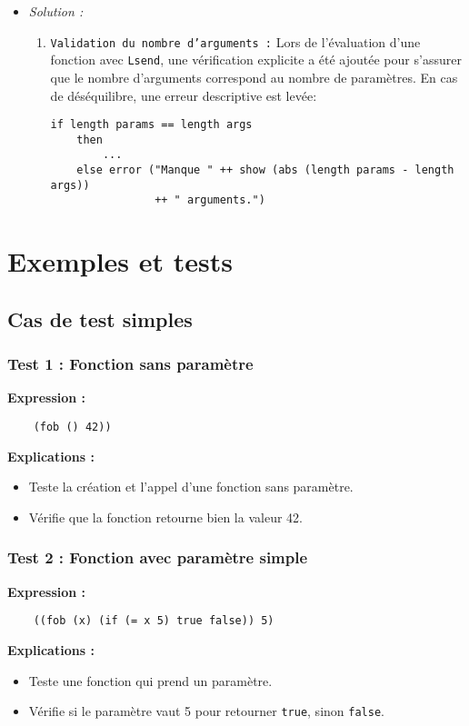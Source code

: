 \documentclass{article}
\begin{document}
\begin{enumerate}
\begin{itemize}
            \newpage
            \item \textit{Solution :} 
                \begin{enumerate}
                    \item \texttt{Validation du nombre d'arguments :} Lors de l’évaluation d’une fonction avec \texttt{Lsend}, une 
                                  vérification explicite a été ajoutée pour s'assurer que le nombre d'arguments correspond au nombre 
                                  de paramètres. En cas de déséquilibre, une erreur descriptive est levée:\newline
                    \begin{lstlisting}
if length params == length args
    then 
        ...
    else error ("Manque " ++ show (abs (length params - length args)) 
                ++ " arguments.")
                    \end{lstlisting}
                \end{enumerate}
        \end{itemize}
\end{enumerate}

\section{Exemples et tests} 
\subsection{Cas de test simples} 
\subsubsection*{Test 1 : Fonction sans paramètre} 
\hspace{.5cm}\textbf{Expression :} 
\begin{verbatim} 
    (fob () 42)) 
\end{verbatim} 
\hspace{.5cm}\textbf{Explications :} 
\begin{itemize}[left=1cm] 
    \item Teste la création et l'appel d'une fonction sans paramètre. 
    \item Vérifie que la fonction retourne bien la valeur 42. 
\end{itemize}
\subsubsection*{Test 2 : Fonction avec paramètre simple} 
\hspace{.5cm}\textbf{Expression :} 
\begin{verbatim} 
    ((fob (x) (if (= x 5) true false)) 5) 
\end{verbatim} 
\hspace{.5cm}\textbf{Explications :} 
\begin{itemize}[left=1cm] 
    \item Teste une fonction qui prend un paramètre. 
    \item Vérifie si le paramètre vaut 5 pour retourner \texttt{true}, sinon \texttt{false}. 
\end{itemize}
\end{document}
